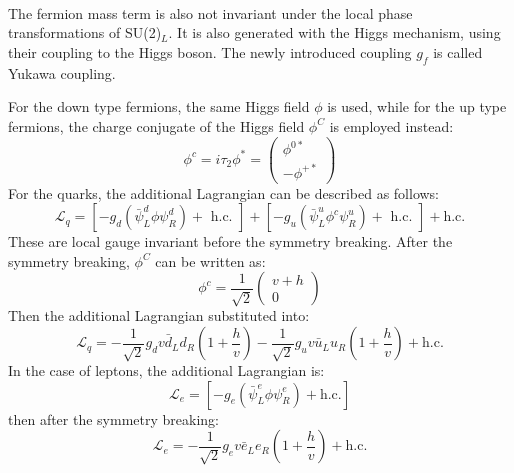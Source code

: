 \\ \\
\noindent\textbf{} \\ 
The fermion mass term is also not invariant under the local phase transformations of SU(2)$_L$. It is also generated with the Higgs mechanism, using their coupling to the Higgs boson. The newly introduced coupling $g_f$ is called Yukawa coupling.

For the down type fermions, the same Higgs field $\phi$ is used, while for the up type fermions, the charge conjugate of the Higgs field $\phi^C$ is employed instead:
\begin{equation}
\phi^{c}=i \tau_{2} \phi^{*}=\left(\begin{array}{c}
\phi^{0 *} \\
-\phi^{+*}
\end{array}\right)
\end{equation}
For the quarks, the additional Lagrangian can be described as follows:
\begin{equation}
\mathcal{L}_{q}=\left[-g_{d}\left(\bar{\psi}_{L}^{d} \phi \psi_{R}^{d}\right)+\text { h.c. }\right]+\left[-g_{u}\left(\bar{\psi}_{L}^{u} \phi^{c} \psi_{R}^{u}\right)+\text { h.c. }\right]+\mathrm{ h.c. }
\end{equation}
These are local gauge invariant before the symmetry breaking. After the symmetry breaking, $\phi^C$ can be written as:
\begin{equation}
\phi^{c} 
=\frac{1}{\sqrt{2}}\left(\begin{array}{c}
v+h \\
0
\end{array}\right)
\end{equation}
Then the additional Lagrangian substituted into:
\begin{equation}
\mathcal{L}_{q}=-\frac{1}{\sqrt{2}} g_{d} v \bar{d}_{L} d_{R}\left(1+\frac{h}{v}\right)-\frac{1}{\sqrt{2}} g_{u} v \bar{u}_{L} u_{R}\left(1+\frac{h}{v}\right)+\mathrm{ h.c. } 
\end{equation}
In the case of leptons, the additional Lagrangian is:
\begin{equation}
\mathcal{L}_{e}=\left[-g_{e}\left(\bar{\psi}_{L}^{e} \phi \psi_{R}^{e}\right)+\mathrm{ h.c. }\right]
\end{equation}
then after the symmetry breaking:
\begin{equation}
\mathcal{L}_{e}=-\frac{1}{\sqrt{2}} g_{e} v \bar{e}_{L} e_{R}\left(1+\frac{h}{v}\right)+\mathrm{ h.c. } 
\end{equation}

